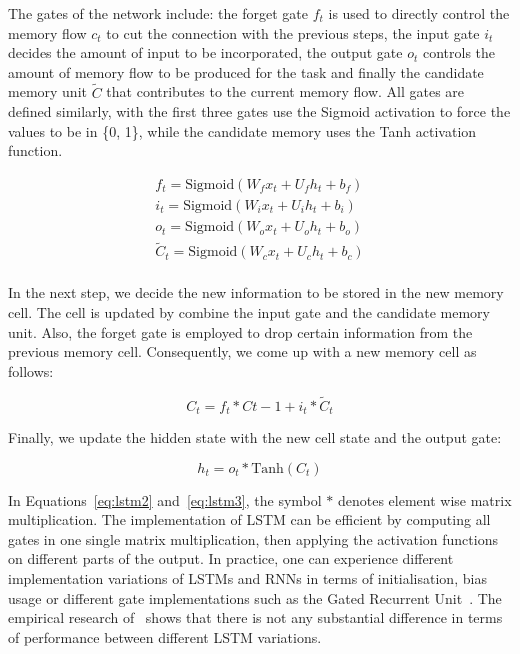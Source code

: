 The gates of the network include: the forget gate $f_t$ is used to directly control the memory flow $c_t$ to cut the connection with the previous steps, the input gate $i_t$ decides the amount of input to be incorporated, the output gate $o_t$ controls the amount of memory flow to be produced for the task and finally the candidate memory unit $\tilde{C}$ that contributes to the current memory flow. All gates are defined similarly, with the first three gates use the Sigmoid activation to force the values to be in \{0, 1\}, while the candidate memory uses the Tanh activation function.

\begin{equation}
\begin{aligned}
f_t = \text{Sigmoid}(W_fx_t + U_fh_t + b_f) \\
i_t = \text{Sigmoid}(W_ix_t + U_ih_t + b_i) \\
o_t = \text{Sigmoid}(W_ox_t + U_oh_t + b_o) \\
\tilde{C}_t = \text{Sigmoid}(W_cx_t + U_ch_t + b_c) \\
\end{aligned}
\label{eq:lstm1}
\end{equation}

In the next step, we decide the new information to be stored in the new memory cell. The cell is updated by combine the input gate and the candidate memory unit. Also, the forget gate is employed to drop certain information from the previous memory cell. Consequently, we come up with a new memory cell as follows:

\begin{equation}
C_t = f_t * C{t-1} + i_t * \tilde{C}_t
\label{eq:lstm2}
\end{equation}

Finally, we update the hidden state with the new cell state and the output gate:

\begin{equation}
h_t = o_t * \text{Tanh}(C_t)
\label{eq:lstm3}
\end{equation}

In Equations~\ref{eq:lstm2} and~\ref{eq:lstm3}, the symbol $*$ denotes element wise matrix multiplication. The implementation of LSTM can be efficient by computing all gates in one single matrix multiplication, then applying the activation functions on different parts of the output. In practice, one can experience different implementation variations of LSTMs and RNNs in terms of initialisation, bias usage or different gate implementations such as the Gated Recurrent Unit~\cite{cho2014learning}. The empirical research of~\cite{zaremba2015empirical} shows that there is not any substantial difference in terms of performance between different LSTM variations. 


